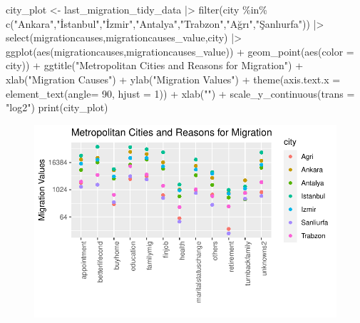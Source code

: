 \documentclass[
  11pt,
  a4paper,
  DIV=11,
  numbers=noendperiod]{scrartcl}
\newenvironment{Shaded}{\begin{snugshade}}{\end{snugshade}}
\newcommand{\AttributeTok}[1]{\textcolor[rgb]{0.40,0.45,0.13}{#1}}
\newcommand{\DecValTok}[1]{\textcolor[rgb]{0.68,0.00,0.00}{#1}}
\newcommand{\FunctionTok}[1]{\textcolor[rgb]{0.28,0.35,0.67}{#1}}
\newcommand{\NormalTok}[1]{\textcolor[rgb]{0.00,0.23,0.31}{#1}}
\newcommand{\OtherTok}[1]{\textcolor[rgb]{0.00,0.23,0.31}{#1}}
\newcommand{\SpecialCharTok}[1]{\textcolor[rgb]{0.37,0.37,0.37}{#1}}
\newcommand{\StringTok}[1]{\textcolor[rgb]{0.13,0.47,0.30}{#1}}
\begin{document}
\begin{Shaded}
\begin{Highlighting}[]
\NormalTok{city\_plot }\OtherTok{\textless{}{-}}\NormalTok{ last\_migration\_tidy\_data }\SpecialCharTok{|\textgreater{}} \FunctionTok{filter}\NormalTok{(city }\SpecialCharTok{\%in\%} \FunctionTok{c}\NormalTok{(}\StringTok{"Ankara"}\NormalTok{,}\StringTok{"İstanbul"}\NormalTok{,}\StringTok{"İzmir"}\NormalTok{,}\StringTok{"Antalya"}\NormalTok{,}\StringTok{"Trabzon"}\NormalTok{,}\StringTok{"Ağrı"}\NormalTok{,}\StringTok{"Şanlıurfa"}\NormalTok{)) }\SpecialCharTok{|\textgreater{}} \FunctionTok{select}\NormalTok{(migrationcauses,migrationcauses\_value,city) }\SpecialCharTok{|\textgreater{}}
  \FunctionTok{ggplot}\NormalTok{(}\FunctionTok{aes}\NormalTok{(migrationcauses,migrationcauses\_value)) }\SpecialCharTok{+} \FunctionTok{geom\_point}\NormalTok{(}\FunctionTok{aes}\NormalTok{(}\AttributeTok{color =}\NormalTok{ city)) }\SpecialCharTok{+}
  \FunctionTok{ggtitle}\NormalTok{(}\StringTok{"Metropolitan Cities and Reasons for Migration"}\NormalTok{) }\SpecialCharTok{+} \FunctionTok{xlab}\NormalTok{(}\StringTok{"Migration Causes"}\NormalTok{) }\SpecialCharTok{+}
  \FunctionTok{ylab}\NormalTok{(}\StringTok{"Migration Values"}\NormalTok{) }\SpecialCharTok{+} \FunctionTok{theme}\NormalTok{(}\AttributeTok{axis.text.x =} \FunctionTok{element\_text}\NormalTok{(}\AttributeTok{angle=} \DecValTok{90}\NormalTok{, }\AttributeTok{hjust =} \DecValTok{1}\NormalTok{)) }\SpecialCharTok{+} \FunctionTok{xlab}\NormalTok{(}\StringTok{""}\NormalTok{) }\SpecialCharTok{+} \FunctionTok{scale\_y\_continuous}\NormalTok{(}\AttributeTok{trans =} \StringTok{"log2"}\NormalTok{)  }
\FunctionTok{print}\NormalTok{(city\_plot)}
\end{Highlighting}
\end{Shaded}

\begin{figure}[H]

{\centering \includegraphics{analysis_files/figure-pdf/unnamed-chunk-4-1.pdf}

}

\end{figure}
\end{document}
